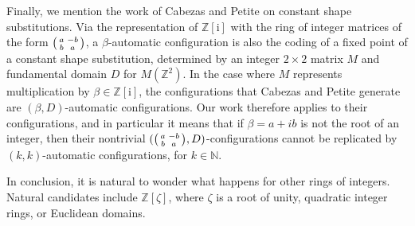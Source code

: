 \documentclass{amsart}
\newcommand{\Z}{\mathbb{Z}}
\newcommand{\ii}{\mathrm{i}}
\newtheorem*{main theorem}{Theorem \ref{thm:main-gaussian}}
\theoremstyle{definition}
\begin{document}
Finally, we mention the work of Cabezas and Petite \cite{Cabezas-Petite} on constant shape substitutions. Via the representation of $\Z[\ii]$ with the ring of integer matrices of the form $\begin{psmallmatrix} a & -b\\ b& a \end{psmallmatrix}$, a $\beta$-automatic configuration is also the coding of a fixed point of a constant shape substitution, determined by an integer $2\times 2$ matrix $M$ and  fundamental domain $D$ for $M(\Z^2)$. In the case where $M$ represents multiplication by $\beta\in \Z[\ii]$, the configurations that Cabezas and Petite generate are $(\beta,D)$-automatic configurations. Our work therefore applies to their configurations, and in particular it means that  if $\beta=a+ib$ is not the root of an integer, then their nontrivial $(\begin{psmallmatrix} a & -b\\ b& a \end{psmallmatrix},D)$-configurations  cannot be replicated by $(k,k)$-automatic configurations, for $k\in \mathbb N$.

In conclusion, it is natural to wonder what happens for other rings of integers. Natural candidates include $\Z[\zeta]$, where $\zeta$ is a root of unity,  quadratic integer rings, or Euclidean domains.




\end{document}
